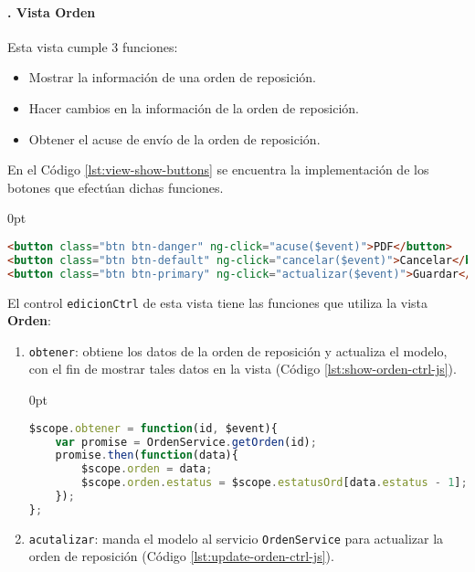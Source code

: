 \begin{enumerate}
\paragraph{. Vista Orden\\}
Esta vista cumple 3 funciones:
\begin{itemize}
	\item Mostrar la información de una orden de reposición.
	\item Hacer cambios en la información de la orden de reposición.
	\item Obtener el acuse de envío de la orden de reposición.
\end{itemize}
En el Código \ref{lst:view-show-buttons} se encuentra la implementación de los botones que efectúan dichas funciones. 
\begin{adjustwidth}{\listingfixwidth}{0pt}
\begin{lstlisting}[language=HTML, captionpos=b, caption={Controles de la vista de orden de reposición.}, label={lst:view-show-buttons}]
<button class="btn btn-danger" ng-click="acuse($event)">PDF</button>
<button class="btn btn-default" ng-click="cancelar($event)">Cancelar</button>
<button class="btn btn-primary" ng-click="actualizar($event)">Guardar</button>
\end{lstlisting}
\end{adjustwidth}
El control \texttt{edicionCtrl} de esta vista tiene las funciones que utiliza la vista \textbf{Orden}:
\begin{enumerate}
	\item \texttt{obtener}: obtiene los datos de la orden de reposición y actualiza el modelo, con el fin de mostrar tales datos en la vista (Código \ref{lst:show-orden-ctrl-js}).
\begin{adjustwidth}{\listingfixlargewidth}{0pt}
\begin{lstlisting}[language=Javascript, caption={Función del controlador para llenar los datos de la vista de orden de reposición.}, captionpos=b, label={lst:show-orden-ctrl-js}]
$scope.obtener = function(id, $event){
	var promise = OrdenService.getOrden(id);
	promise.then(function(data){
		$scope.orden = data;
		$scope.orden.estatus = $scope.estatusOrd[data.estatus - 1];
	});
};
\end{lstlisting}
\end{adjustwidth}
	\item \texttt{acutalizar}: manda el modelo al servicio \texttt{OrdenService} para actualizar la orden de reposición (Código \ref{lst:update-orden-ctrl-js}).

\end{enumerate}
\end{enumerate}
